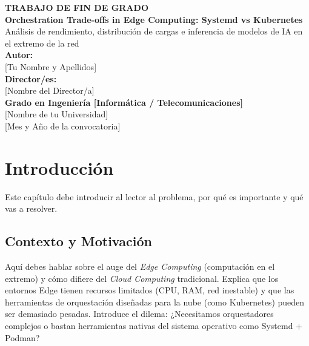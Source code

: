 \documentclass[11pt, a4paper]{report}
\begin{document}
\begin{titlepage}
    \centering
    \vspace*{2cm}
    
    {\Large \textbf{TRABAJO DE FIN DE GRADO}} \\[1.5cm]
    
    {\huge \textbf{Orchestration Trade-offs in Edge Computing: Systemd vs Kubernetes}}\\[0.5cm]
    {\Large Análisis de rendimiento, distribución de cargas e inferencia de modelos de IA en el extremo de la red}\\[2cm]
    
    {\Large \textbf{Autor:}} \\
    {\large [Tu Nombre y Apellidos]}\\[1cm]
    
    {\Large \textbf{Director/es:}} \\
    {\large [Nombre del Director/a]}\\[2cm]
    
    {\large \textbf{Grado en Ingeniería [Informática / Telecomunicaciones]}} \\[0.5cm]
    {\large [Nombre de tu Universidad]} \\[0.5cm]
    {\large [Mes y Año de la convocatoria]}
    
    \vfill
\end{titlepage}

\tableofcontents
\listoffigures
\listoftables
\cleardoublepage


\chapter{Introducción}

Este capítulo debe introducir al lector al problema, por qué es importante y qué vas a resolver.

\section{Contexto y Motivación}
Aquí debes hablar sobre el auge del \textit{Edge Computing} (computación en el extremo) y cómo difiere del \textit{Cloud Computing} tradicional. Explica que los entornos Edge tienen recursos limitados (CPU, RAM, red inestable) y que las herramientas de orquestación diseñadas para la nube (como Kubernetes) pueden ser demasiado pesadas. Introduce el dilema: ¿Necesitamos orquestadores complejos o bastan herramientas nativas del sistema operativo como Systemd + Podman?
\end{document}
